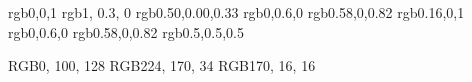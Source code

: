 % 
%

\definecolor{keywordblue}	{rgb}{0,0,1}
\definecolor{keywordorange}	{rgb}{1, 0.3, 0}
\definecolor{keywordpurple}	{rgb}{0.50,0.00,0.33}
\definecolor{stringgreen}	{rgb}{0,0.6,0}
\definecolor{stringmauve}	{rgb}{0.58,0,0.82}
\definecolor{stringblue}	{rgb}{0.16,0,1}
\definecolor{commentgreen}	{rgb}{0,0.6,0}
\definecolor{commentmauve}	{rgb}{0.58,0,0.82}
\definecolor{numbergray}	{rgb}{0.5,0.5,0.5}

\definecolor{mycerulean}	{RGB}{0, 100, 128}	%
\definecolor{myocker}		{RGB}{224, 170, 34}	%
\definecolor{mymaroon}		{RGB}{170, 16, 16}	%

